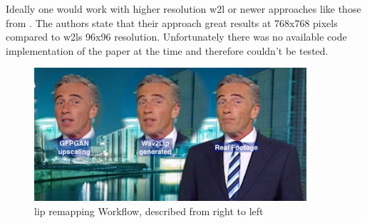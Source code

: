 \documentclass[
  a4paper,  %
  twoside,  %
  bibliography=totoc,
  headsepline,
  cleardoublepage=empty,
  parskip=half,
  draft=false
]{scrbook}
\begin{document}
Ideally one would work with higher resolution \gls{w2l} or newer approaches like those from \citet{guptaGeneratingUltraHighResolution2023}. The authors state that their approach great results at 768x768 pixels compared to \gls{w2l}s 96x96 resolution. Unfortunately there was no available code implementation of the paper at the time and therefore couldn't be tested.

\begin{figure}[h]
  \centering
  \includegraphics[width=0.9\textwidth]{./graphics/images/wav2lip-demo.png}
  \caption{lip remapping Workflow, described from right to left}
  \label{fig:wav2lip-demo}
\end{figure}
\end{document}
